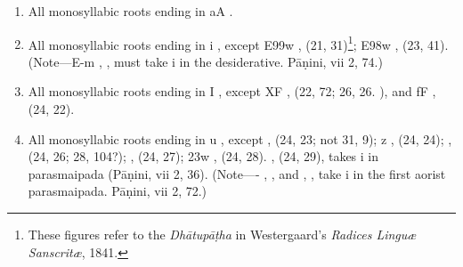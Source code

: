 \begin{enumerate}
\item All monosyllabic roots ending in {\dn aA} .

\item All monosyllabic roots ending in {\dn i} , except {\dn E\399w}
  ,  (21, 31)\footnote{These figures refer to the
    \emph{Dhātupāṭha} in Westergaard's \emph{Radices Linguæ Sanscritæ},
    1841.}; {\dn E\398w} ,  (23, 41). (Note—{\dn E-m}
  , , must take {\dn i}  in the desiderative.
  Pāṇini, vii 2, 74.)

\item All monosyllabic roots ending in {\dn I} , except {\dn XF}
  ,  (22, 72; 26, 26. ), and {\dn fF}
  ,  (24, 22).

\item All monosyllabic roots ending in {\dn u} , except {\dn {}} ,
   (24, 23; not 31, 9); {\dn z} ,  (24,
  24); {\dn {}} ,  (24, 26; 28, 104?); {\dn {}}
  ,  (24, 27); {\dn \323w} ,  (24, 28). {\dn {}} ,  (24, 29), takes {\dn i}
   in parasmaipada (Pāṇini, vii 2, 36). (Note—{\dn -} ,
  , and {\dn {}} , , take {\dn i}  in
  the first aorist parasmaipada. Pāṇini, vii 2, 72.)
\end{enumerate}